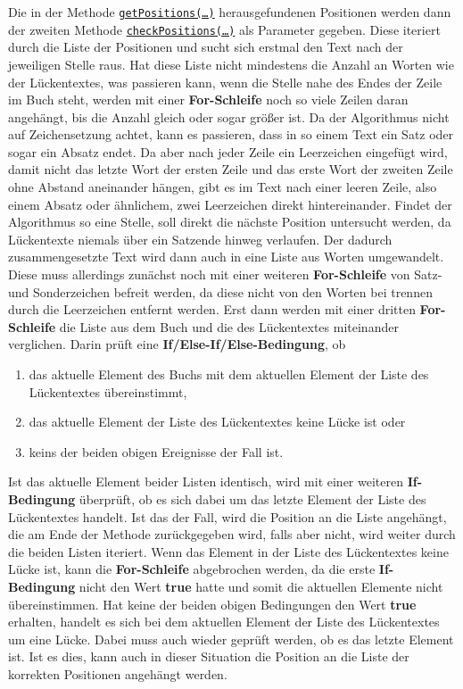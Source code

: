 \documentclass[a4paper, 10pt, ngerman]{scrartcl}
\begin{document}
Die in der Methode \hyperref[sec:getPositions()]{\texttt{getPositions(\ldots)}} herausgefundenen Positionen werden dann der zweiten Methode \hyperref[sec:checkPositions()]{\texttt{checkPositions(\ldots)}} als Parameter gegeben.
Diese iteriert durch die Liste der Positionen
und sucht sich erstmal den Text nach der jeweiligen Stelle raus.
Hat diese Liste nicht mindestens die Anzahl an Worten wie der Lückentextes,
was passieren kann,
wenn die Stelle nahe des Endes der Zeile im Buch steht,
werden mit einer \textbf{For-Schleife} noch so viele Zeilen daran angehängt,
bis die Anzahl gleich oder sogar größer ist.
Da der Algorithmus nicht auf Zeichensetzung achtet,
kann es passieren,
dass in so einem Text ein Satz
oder sogar ein Absatz endet.
Da aber nach jeder Zeile ein Leerzeichen eingefügt wird,
damit nicht das letzte Wort der ersten Zeile
und das erste Wort der zweiten Zeile ohne Abstand aneinander hängen,
gibt es im Text nach einer leeren Zeile,
also einem Absatz oder ähnlichem,
zwei Leerzeichen direkt hintereinander.
Findet der Algorithmus so eine Stelle,
soll direkt die nächste Position untersucht werden,
da Lückentexte niemals über ein Satzende hinweg verlaufen.
Der dadurch zusammengesetzte Text wird dann auch in eine Liste aus Worten umgewandelt.
Diese muss allerdings zunächst noch mit einer weiteren \textbf{For-Schleife} von Satz- und Sonderzeichen befreit werden,
da diese nicht von den Worten bei trennen durch die Leerzeichen entfernt werden.
Erst dann werden mit einer dritten \textbf{For-Schleife} die Liste aus dem Buch und die des Lückentextes miteinander verglichen.
Darin prüft eine \textbf{If/Else-If/Else-Bedingung},
ob
\begin{enumerate}
\item das aktuelle Element des Buchs mit dem aktuellen Element der Liste des Lückentextes übereinstimmt,
\item das aktuelle Element der Liste des Lückentextes keine Lücke ist oder
\item keins der beiden obigen Ereignisse der Fall ist.
\end{enumerate}
Ist das aktuelle Element beider Listen identisch,
wird mit einer weiteren \textbf{If-Bedingung} überprüft,
ob es sich dabei um das letzte Element der Liste des Lückentextes handelt.
Ist das der Fall,
wird die Position an die Liste angehängt,
die am Ende der Methode zurückgegeben wird,
falls aber nicht,
wird weiter durch die beiden Listen iteriert.
Wenn das Element in der Liste des Lückentextes keine Lücke ist, kann die \textbf{For-Schleife} abgebrochen werden,
da die erste \textbf{If-Bedingung} nicht den Wert \textbf{true} hatte
und somit die aktuellen Elemente nicht übereinstimmen.
Hat keine der beiden obigen Bedingungen den Wert \textbf{true} erhalten,
handelt es sich bei dem aktuellen Element der Liste des Lückentextes um eine Lücke.
Dabei muss auch wieder geprüft werden,
ob es das letzte Element ist.
Ist es dies,
kann auch in dieser Situation die Position an die Liste der korrekten Positionen angehängt werden.
\end{document}
